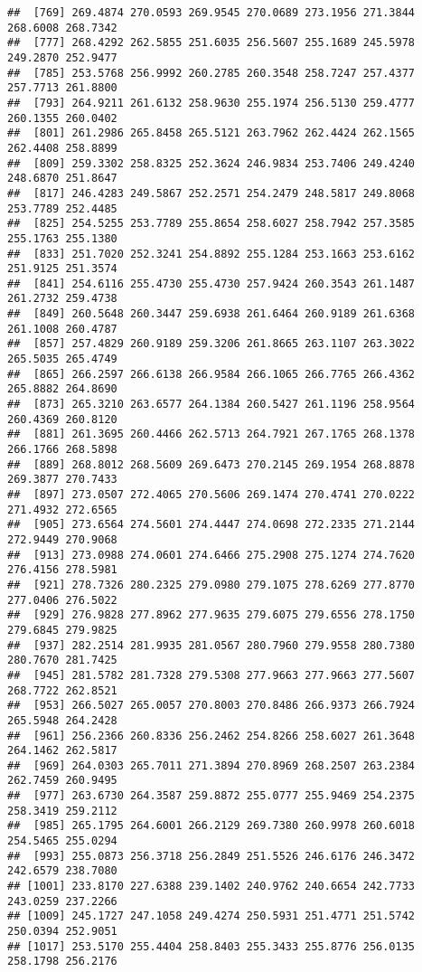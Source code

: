 \documentclass[
]{article}
\begin{document}
\begin{verbatim}
##  [769] 269.4874 270.0593 269.9545 270.0689 273.1956 271.3844 268.6008 268.7342
##  [777] 268.4292 262.5855 251.6035 256.5607 255.1689 245.5978 249.2870 252.9477
##  [785] 253.5768 256.9992 260.2785 260.3548 258.7247 257.4377 257.7713 261.8800
##  [793] 264.9211 261.6132 258.9630 255.1974 256.5130 259.4777 260.1355 260.0402
##  [801] 261.2986 265.8458 265.5121 263.7962 262.4424 262.1565 262.4408 258.8899
##  [809] 259.3302 258.8325 252.3624 246.9834 253.7406 249.4240 248.6870 251.8647
##  [817] 246.4283 249.5867 252.2571 254.2479 248.5817 249.8068 253.7789 252.4485
##  [825] 254.5255 253.7789 255.8654 258.6027 258.7942 257.3585 255.1763 255.1380
##  [833] 251.7020 252.3241 254.8892 255.1284 253.1663 253.6162 251.9125 251.3574
##  [841] 254.6116 255.4730 255.4730 257.9424 260.3543 261.1487 261.2732 259.4738
##  [849] 260.5648 260.3447 259.6938 261.6464 260.9189 261.6368 261.1008 260.4787
##  [857] 257.4829 260.9189 259.3206 261.8665 263.1107 263.3022 265.5035 265.4749
##  [865] 266.2597 266.6138 266.9584 266.1065 266.7765 266.4362 265.8882 264.8690
##  [873] 265.3210 263.6577 264.1384 260.5427 261.1196 258.9564 260.4369 260.8120
##  [881] 261.3695 260.4466 262.5713 264.7921 267.1765 268.1378 266.1766 268.5898
##  [889] 268.8012 268.5609 269.6473 270.2145 269.1954 268.8878 269.3877 270.7433
##  [897] 273.0507 272.4065 270.5606 269.1474 270.4741 270.0222 271.4932 272.6565
##  [905] 273.6564 274.5601 274.4447 274.0698 272.2335 271.2144 272.9449 270.9068
##  [913] 273.0988 274.0601 274.6466 275.2908 275.1274 274.7620 276.4156 278.5981
##  [921] 278.7326 280.2325 279.0980 279.1075 278.6269 277.8770 277.0406 276.5022
##  [929] 276.9828 277.8962 277.9635 279.6075 279.6556 278.1750 279.6845 279.9825
##  [937] 282.2514 281.9935 281.0567 280.7960 279.9558 280.7380 280.7670 281.7425
##  [945] 281.5782 281.7328 279.5308 277.9663 277.9663 277.5607 268.7722 262.8521
##  [953] 266.5027 265.0057 270.8003 270.8486 266.9373 266.7924 265.5948 264.2428
##  [961] 256.2366 260.8336 256.2462 254.8266 258.6027 261.3648 264.1462 262.5817
##  [969] 264.0303 265.7011 271.3894 270.8969 268.2507 263.2384 262.7459 260.9495
##  [977] 263.6730 264.3587 259.8872 255.0777 255.9469 254.2375 258.3419 259.2112
##  [985] 265.1795 264.6001 266.2129 269.7380 260.9978 260.6018 254.5465 255.0294
##  [993] 255.0873 256.3718 256.2849 251.5526 246.6176 246.3472 242.6579 238.7080
## [1001] 233.8170 227.6388 239.1402 240.9762 240.6654 242.7733 243.0259 237.2266
## [1009] 245.1727 247.1058 249.4274 250.5931 251.4771 251.5742 250.0394 252.9051
## [1017] 253.5170 255.4404 258.8403 255.3433 255.8776 256.0135 258.1798 256.2176

\end{verbatim}
\end{document}

